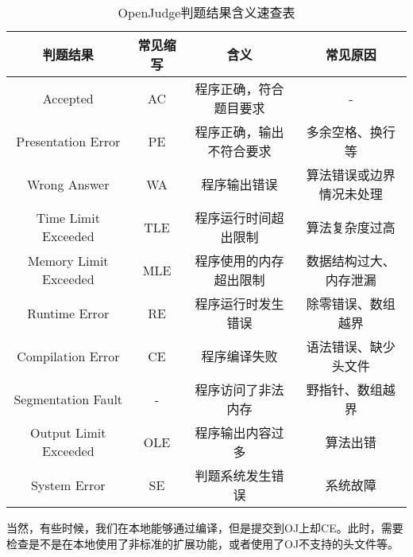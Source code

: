 \documentclass[../main.tex]{subfiles}
\begin{document}
\begin{table}[ht]\small
  \centering
  \begin{tabular}{cccc}
    \toprule
    判题结果 & 常见缩写 & 含义 & 常见原因 \\
    \midrule
    Accepted & AC & 程序正确，符合题目要求 & - \\
    Presentation Error & PE & 程序正确，输出不符合要求 & 多余空格、换行等 \\
    \midrule
    Wrong Answer & WA & 程序输出错误 & 算法错误或边界情况未处理 \\
    Time Limit Exceeded & TLE & 程序运行时间超出限制 & 算法复杂度过高 \\
    Memory Limit Exceeded & MLE & 程序使用的内存超出限制 & 数据结构过大、内存泄漏 \\
    Runtime Error & RE & 程序运行时发生错误 & 除零错误、数组越界 \\
    Compilation Error & CE & 程序编译失败 & 语法错误、缺少头文件 \\
    Segmentation Fault & - & 程序访问了非法内存 & 野指针、数组越界 \\
    Output Limit Exceeded & OLE & 程序输出内容过多 & 算法出错 \\
    \midrule
    System Error & SE & 判题系统发生错误 & 系统故障 \\
    \bottomrule
  \end{tabular}
  \caption{OpenJudge判题结果含义速查表}
  \label{tab:oj_results}
\end{table}

当然，有些时候，我们在本地能够通过编译，但是提交到OJ上却CE。此时，需要检查是不是在本地使用了非标准的扩展功能，或者使用了OJ不支持的头文件等。
\end{document}
